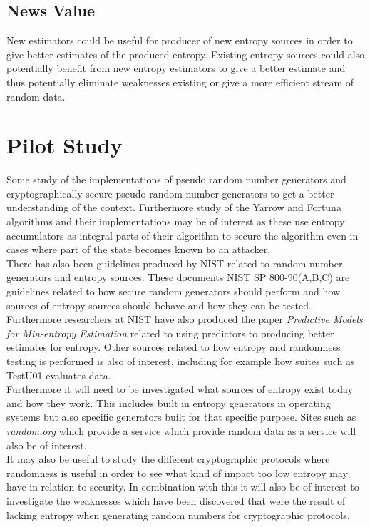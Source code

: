 \documentclass[a4paper,11pt]{report}
\begin{document}
\subsection*{News Value}
New estimators could be useful for producer of new entropy sources in order to
give better estimates of the produced entropy. Existing entropy sources could
also potentially benefit from new entropy estimators to give a better estimate
and thus potentially eliminate weaknesses existing or give a more efficient 
stream of random data.

\section*{Pilot Study}
Some study of the implementations of pseudo random number generators and
cryptographically secure pseudo random number generators to get a better
understanding of the context. Furthermore study of the Yarrow and
Fortuna algorithms and their implementations may be of interest as these 
use entropy accumulators as integral parts of their algorithm to secure the 
algorithm even in cases where part of the state becomes known to an attacker.
\\

\noindent
There has also been guidelines produced by NIST related to random number
generators and entropy sources. These documents NIST SP 800-90(A,B,C) 
\cite{800-90A}\cite{800-90B}\cite{800-90C} are guidelines related to 
how secure random generators should perform and how sources of entropy 
sources should behave and how they can be tested.
Furthermore researchers at NIST have also produced 
the paper \textit{Predictive Models for Min-entropy Estimation}
\cite{eprint-2015-26658}
related to using predictors to producing better estimates for entropy.
Other sources related to how entropy and randomness testing is performed is
also of interest, including for example how suites such as TestU01 evaluates
data.
\\

\noindent
Furthermore it will need to be investigated what sources of entropy exist today
and how they work. This includes built in entropy generators in operating 
systems but also specific generators built for that specific purpose. Sites
such as \textit{random.org}\cite{haahr2010random} which provide a service which 
provide random data as a service will also be of interest.
\\

\noindent
It may also be useful to study the different cryptographic protocols 
where randomness is useful in order to see what kind of impact too low entropy 
may have in relation to security. In combination with this it will also be 
of interest to investigate the weaknesses which have been discovered that were 
the result of lacking entropy when generating random numbers for cryptographic 
protocols.
\end{document}
